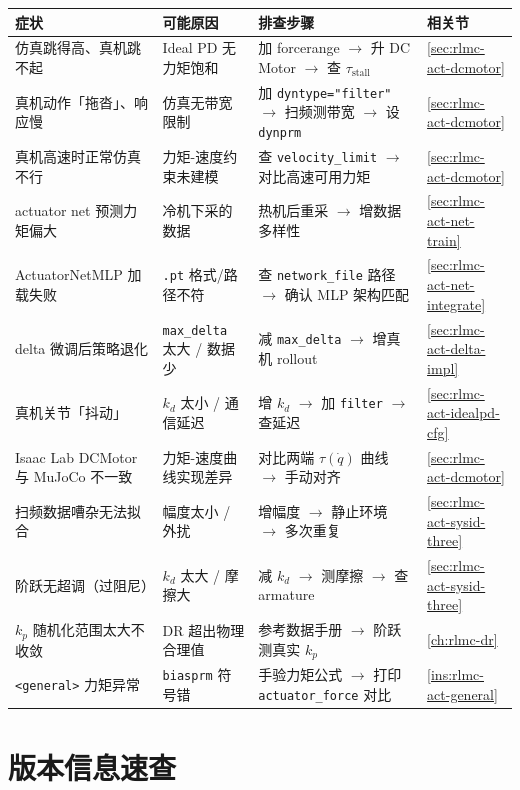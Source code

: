 \begin{center}
\small
\begin{tabular}{@{}p{3.4cm}p{3.0cm}p{4.2cm}p{2.0cm}@{}}
\toprule
症状 & 可能原因 & 排查步骤 & 相关节 \\
\midrule
仿真跳得高、真机跳不起 & Ideal PD 无力矩饱和 & 加 forcerange $\to$ 升 DC Motor $\to$ 查 $\tau_{\mathrm{stall}}$ & \cref{sec:rlmc-act-dcmotor} \\
真机动作「拖沓」、响应慢 & 仿真无带宽限制 & 加 \verb|dyntype="filter"| $\to$ 扫频测带宽 $\to$ 设 \verb|dynprm| & \cref{sec:rlmc-act-dcmotor} \\
真机高速时正常仿真不行 & 力矩-速度约束未建模 & 查 \verb|velocity_limit| $\to$ 对比高速可用力矩 & \cref{sec:rlmc-act-dcmotor} \\
actuator net 预测力矩偏大 & 冷机下采的数据 & 热机后重采 $\to$ 增数据多样性 & \cref{sec:rlmc-act-net-train} \\
ActuatorNetMLP 加载失败 & \verb|.pt| 格式/路径不符 & 查 \verb|network_file| 路径 $\to$ 确认 MLP 架构匹配 & \cref{sec:rlmc-act-net-integrate} \\
delta 微调后策略退化 & \verb|max_delta| 太大 / 数据少 & 减 \verb|max_delta| $\to$ 增真机 rollout & \cref{sec:rlmc-act-delta-impl} \\
真机关节「抖动」 & $k_d$ 太小 / 通信延迟 & 增 $k_d$ $\to$ 加 \verb|filter| $\to$ 查延迟 & \cref{sec:rlmc-act-idealpd-cfg} \\
Isaac Lab DCMotor 与 MuJoCo 不一致 & 力矩-速度曲线实现差异 & 对比两端 $\tau(\dot q)$ 曲线 $\to$ 手动对齐 & \cref{sec:rlmc-act-dcmotor} \\
扫频数据嘈杂无法拟合 & 幅度太小 / 外扰 & 增幅度 $\to$ 静止环境 $\to$ 多次重复 & \cref{sec:rlmc-act-sysid-three} \\
阶跃无超调（过阻尼） & $k_d$ 太大 / 摩擦大 & 减 $k_d$ $\to$ 测摩擦 $\to$ 查 armature & \cref{sec:rlmc-act-sysid-three} \\
$k_p$ 随机化范围太大不收敛 & DR 超出物理合理值 & 参考数据手册 $\to$ 阶跃测真实 $k_p$ & \cref{ch:rlmc-dr} \\
\verb|<general>| 力矩异常 & \verb|biasprm| 符号错 & 手验力矩公式 $\to$ 打印 \verb|actuator_force| 对比 & \cref{ins:rlmc-act-general} \\
\bottomrule
\end{tabular}
\end{center}

\section*{版本信息速查}
\label{sec:rlmc-act-versions}

